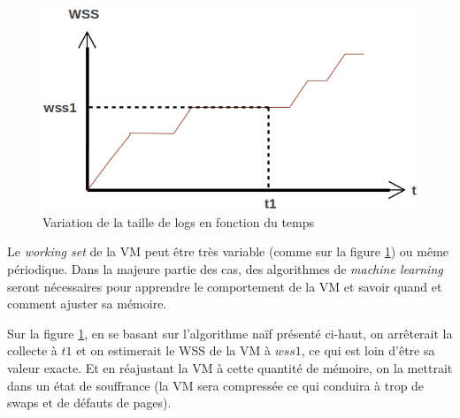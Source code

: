 \begin{figure}[H]
    \centering
    \includegraphics[scale=.5]{chapters/3/fig3/courbe_wss_2}
    \caption{Variation de la taille de logs en fonction du temps}
    \label{fig:courbe_wss_var}
\end{figure}

\noindent Le \textit{working set} de la VM peut être très variable (comme sur la figure \ref{fig:courbe_wss_var}) ou même périodique. Dans la majeure partie des cas, des algorithmes de \textit{machine learning} seront nécessaires pour apprendre le comportement de la VM et savoir quand et comment ajuster sa mémoire.

\noindent Sur la figure \ref{fig:courbe_wss_var}, en se basant sur l'algorithme naïf présenté ci-haut, on arrêterait la collecte à $t1$ et on estimerait le WSS de la VM à $wss1$, ce qui est loin d'être sa valeur exacte. Et en réajustant la VM à cette quantité de mémoire, on la mettrait dans un état de souffrance (la VM sera compressée ce qui conduira à trop de swaps et de défauts de pages).

